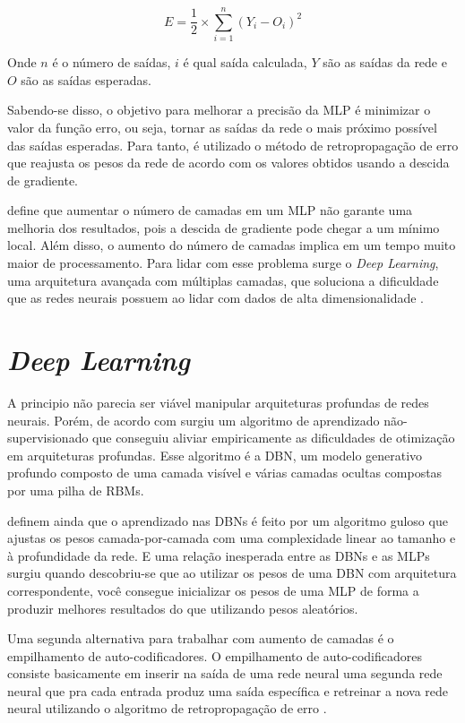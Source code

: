 \begin{equation}
E=\dfrac{1}{2}\times \sum_{i=1}^{n}(Y_i-O_i)^2
\label{eq:5}
\end{equation}

Onde $n$ é o número de saídas, $i$ é qual saída calculada, $Y$ são as saídas da rede e $O$ são as saídas esperadas.

Sabendo-se disso, o objetivo para melhorar a precisão da \ac{MLP} é minimizar o valor da função erro, ou seja, tornar as saídas da rede o mais próximo possível das saídas esperadas. Para tanto, é utilizado o método de retropropagação de erro que reajusta os pesos da rede de acordo com os valores obtidos usando a descida de gradiente.

 define que aumentar o número de camadas em um \ac{MLP} não garante uma melhoria dos resultados, pois a descida de gradiente pode chegar a um mínimo local. Além disso, o aumento do número de camadas implica em um tempo muito maior de processamento. Para lidar com esse problema surge o \emph{Deep Learning}, uma arquitetura avançada com múltiplas camadas, que soluciona a dificuldade que as redes neurais possuem ao lidar com dados de alta dimensionalidade \cite{arnold-2011}.

\section{\textit{Deep Learning}}
\label{secao:2:3}


A principio não parecia ser viável manipular arquiteturas profundas de redes neurais. Porém, de acordo com  surgiu um algoritmo de aprendizado não-supervisionado que conseguiu aliviar empiricamente as dificuldades de otimização em arquiteturas profundas. Esse algoritmo é a \ac{DBN}, um modelo generativo profundo composto de uma camada visível e várias camadas ocultas compostas por uma pilha de \ac{RBM}s.

 definem ainda que o aprendizado nas \ac{DBN}s é feito por um algoritmo guloso que ajustas os pesos camada-por-camada com uma complexidade linear ao tamanho e à profundidade da rede. E uma relação inesperada entre as \ac{DBN}s e as \ac{MLP}s surgiu quando descobriu-se que ao utilizar os pesos de uma \ac{DBN} com arquitetura correspondente, você consegue inicializar os pesos de uma \ac{MLP} de forma a produzir melhores resultados do que utilizando pesos aleatórios.

Uma segunda alternativa para trabalhar com aumento de camadas é o empilhamento de auto-codificadores. O empilhamento de auto-codificadores consiste basicamente em inserir na saída de uma rede neural uma segunda rede neural que pra cada entrada produz uma saída específica e retreinar a nova rede neural utilizando o algoritmo de retropropagação de erro \cite{deng-2014}.

